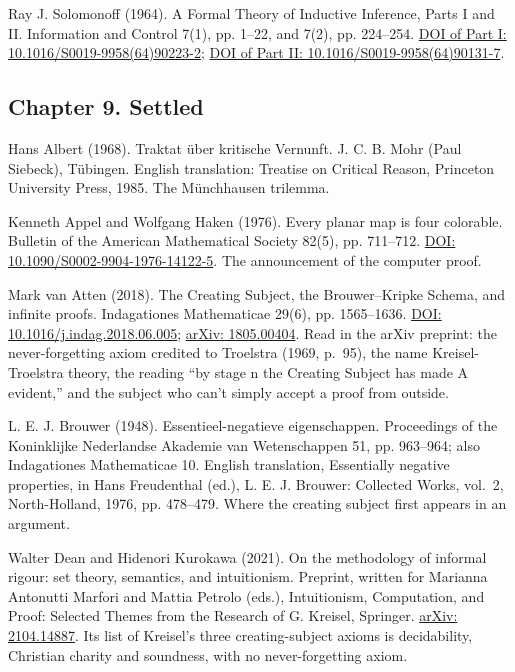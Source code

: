 \documentclass[11pt,twoside]{article}
\theoremstyle{thielethm}
\theoremstyle{thieledef}
\theoremstyle{thieledef}
\theoremstyle{thieledef}
\theoremstyle{thielethm}
\theoremstyle{thieleobs}
\theoremstyle{thielethm}
\begin{document}
\noindent Ray J. Solomonoff (1964). A Formal Theory of Inductive Inference, Parts I and II. Information and Control 7(1), pp. 1--22, and 7(2), pp. 224--254. \href{https://doi.org/10.1016/S0019-9958(64)90223-2}{DOI of Part I: 10.1016/S0019-9958(64)90223-2}; \href{https://doi.org/10.1016/S0019-9958(64)90131-7}{DOI of Part II: 10.1016/S0019-9958(64)90131-7}.
\par\medskip

\subsection*{Chapter 9. Settled}

\noindent Hans Albert (1968). Traktat \"uber kritische Vernunft. J. C. B. Mohr (Paul Siebeck), T\"ubingen. English translation: Treatise on Critical Reason, Princeton University Press, 1985. The M\"unchhausen trilemma.
\par\medskip

\noindent Kenneth Appel and Wolfgang Haken (1976). Every planar map is four colorable. Bulletin of the American Mathematical Society 82(5), pp. 711--712. \href{https://doi.org/10.1090/S0002-9904-1976-14122-5}{DOI: 10.1090/S0002-9904-1976-14122-5}. The announcement of the computer proof.
\par\medskip

\noindent Mark van Atten (2018). The Creating Subject, the Brouwer--Kripke Schema, and infinite proofs. Indagationes Mathematicae 29(6), pp. 1565--1636. \href{https://doi.org/10.1016/j.indag.2018.06.005}{DOI: 10.1016/j.indag.2018.06.005}; \href{https://arxiv.org/abs/1805.00404}{arXiv: 1805.00404}. Read in the arXiv preprint: the never-forgetting axiom credited to Troelstra (1969, p.~95), the name Kreisel-Troelstra theory, the reading ``by stage n the Creating Subject has made A evident,'' and the subject who can't simply accept a proof from outside.
\par\medskip

\noindent L. E. J. Brouwer (1948). Essentieel-negatieve eigenschappen. Proceedings of the Koninklijke Nederlandse Akademie van Wetenschappen 51, pp. 963--964; also Indagationes Mathematicae 10. English translation, Essentially negative properties, in Hans Freudenthal (ed.), L. E. J. Brouwer: Collected Works, vol.~2, North-Holland, 1976, pp. 478--479. Where the creating subject first appears in an argument.
\par\medskip

\noindent Walter Dean and Hidenori Kurokawa (2021). On the methodology of informal rigour: set theory, semantics, and intuitionism. Preprint, written for Marianna Antonutti Marfori and Mattia Petrolo (eds.), Intuitionism, Computation, and Proof: Selected Themes from the Research of G. Kreisel, Springer. \href{https://arxiv.org/abs/2104.14887}{arXiv: 2104.14887}. Its list of Kreisel's three creating-subject axioms is decidability, Christian charity and soundness, with no never-forgetting axiom.
\par\medskip
\end{document}
